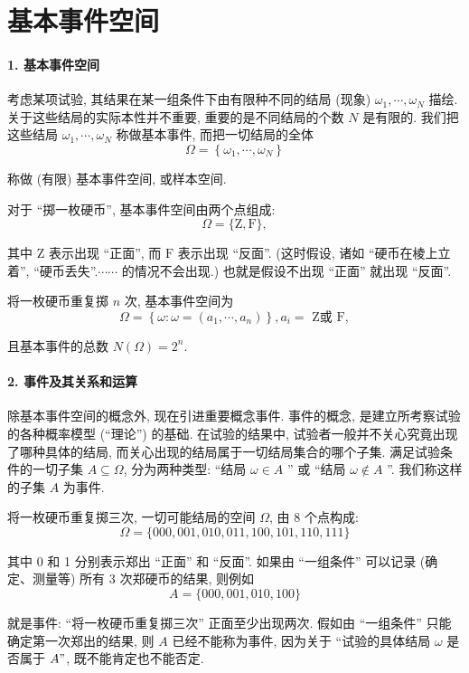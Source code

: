 \section{基本事件空间}
\paragraph{1. 基本事件空间}  考虑某项试验, 其结果在某一组条件下由有限种不同的结局 (现象) $\omega_1, \cdots, \omega_N$ 描绘. 关于这些结局的实际本性并不重要, 重要的是不同结局的个数 $N$ 是有限的. 我们把这些结局 $\omega_1, \cdots, \omega_N$ 称做基本事件, 而把一切结局的全体
$$
\Omega=\left\{\omega_1, \cdots, \omega_N\right\}
$$

称做 (有限) 基本事件空间, 或样本空间.

\begin{example}
    对于 ``掷一枚硬币'', 基本事件空间由两个点组成:
$$
\Omega=\{\mathrm{Z}, \mathrm{F}\},
$$

其中 Z 表示出现 ``正面'', 而 $\mathrm{F}$ 表示出现 ``反面''. (这时假设, 诸如 ``硬币在棱上立着'', ``硬币丢失''.$\cdots \cdots$ 的情况不会出现.) 也就是假设不出现 ``正面'' 就出现 ``反面''.

    将一枚硬币重复掷 $n$ 次, 基本事件空间为
$$
\Omega=\left\{\omega: \omega=\left(a_1, \cdots, a_n\right)\right\}, a_i=\text { Z或 } \mathrm{F},
$$

且基本事件的总数 $N(\Omega)=2^n$.
\end{example}

\paragraph{2. 事件及其关系和运算} 除基本事件空间的概念外, 现在引进重要概念事件. 事件的概念, 是建立所考察试验的各种概率模型 (``理论'') 的基础. 在试验的结果中, 试验者一般并不关心究竟出现了哪种具体的结局, 而关心出现的结局属于一切结局集合的哪个子集. 满足试验条件的一切子集 $A \subseteq \Omega$, 分为两种类型: ``结局 $\omega \in A$ '' 或 ``结局 $\omega \notin A$ ''. 我们称这样的子集 $A$ 为事件.

\begin{example}
    将一枚硬币重复掷三次, 一切可能结局的空间 $\Omega$, 由 8 个点构成:
$$
\Omega=\{000,001,010,011,100,101,110,111\}
$$

其中 0 和 1 分别表示郑出 ``正面'' 和 ``反面''. 如果由 ``一组条件'' 可以记录 (确定、测量等) 所有 3 次郑硬币的结果, 则例如
$$
A=\{000,001,010,100\}
$$

就是事件: ``将一枚硬币重复掷三次'' 正面至少出现两次. 假如由 ``一组条件'' 只能确定第一次郑出的结果, 则 $A$ 已经不能称为事件, 因为关于 ``试验的具体结局 $\omega$ 是否属于 $A "$, 既不能肯定也不能否定.
\end{example}

